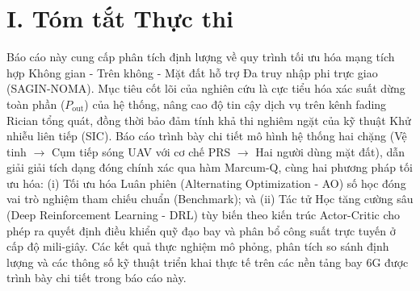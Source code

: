 \section*{I. Tóm tắt Thực thi}

Báo cáo này cung cấp phân tích định lượng về quy trình tối ưu hóa mạng tích hợp Không gian - Trên không - Mặt đất hỗ trợ Đa truy nhập phi trực giao (SAGIN-NOMA). Mục tiêu cốt lõi của nghiên cứu là cực tiểu hóa xác suất dừng toàn phần ($P_{\text{out}}$) của hệ thống, nâng cao độ tin cậy dịch vụ trên kênh fading Rician tổng quát, đồng thời bảo đảm tính khả thi nghiêm ngặt của kỹ thuật Khử nhiễu liên tiếp (SIC). Báo cáo trình bày chi tiết mô hình hệ thống hai chặng (Vệ tinh $\to$ Cụm tiếp sóng UAV với cơ chế PRS $\to$ Hai người dùng mặt đất), dẫn giải giải tích dạng đóng chính xác qua hàm Marcum-Q, cùng hai phương pháp tối ưu hóa: (i) Tối ưu hóa Luân phiên (Alternating Optimization - AO) số học đóng vai trò nghiệm tham chiếu chuẩn (Benchmark); và (ii) Tác tử Học tăng cường sâu (Deep Reinforcement Learning - DRL) tùy biến theo kiến trúc Actor-Critic cho phép ra quyết định điều khiển quỹ đạo bay và phân bổ công suất trực tuyến ở cấp độ mili-giây. Các kết quả thực nghiệm mô phỏng, phân tích so sánh định lượng và các thông số kỹ thuật triển khai thực tế trên các nền tảng bay 6G được trình bày chi tiết trong báo cáo này.
